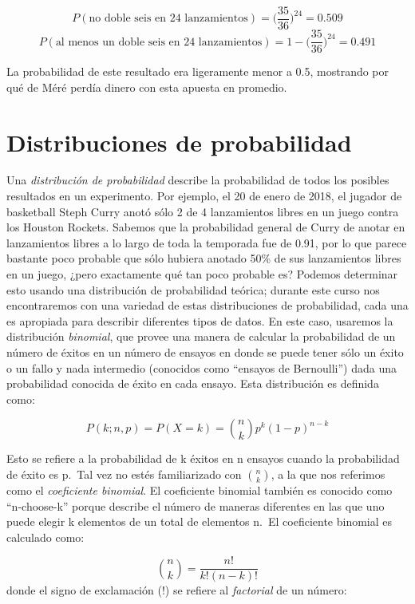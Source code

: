 \documentclass[
  12pt,
]{book}
\theoremstyle{definition}
\theoremstyle{definition}
\theoremstyle{definition}
\theoremstyle{remark}
\begin{document}
\[
P(\text{no doble seis en 24 lanzamientos}) = \bigg(\frac{35}{36}\bigg)^{24}=0.509
\]
\[
P(\text{al menos un doble seis en 24 lanzamientos}) = 1 - \bigg(\frac{35}{36}\bigg)^{24}=0.491
\]

La probabilidad de este resultado era ligeramente menor a 0.5, mostrando por qué de Méré perdía dinero con esta apuesta en promedio.

\hypertarget{distribuciones-de-probabilidad}{%
\section{Distribuciones de probabilidad}\label{distribuciones-de-probabilidad}}

Una \emph{distribución de probabilidad} describe la probabilidad de todos los posibles resultados en un experimento. Por ejemplo, el 20 de enero de 2018, el jugador de basketball Steph Curry anotó sólo 2 de 4 lanzamientos libres en un juego contra los Houston Rockets. Sabemos que la probabilidad general de Curry de anotar en lanzamientos libres a lo largo de toda la temporada fue de 0.91, por lo que parece bastante poco probable que sólo hubiera anotado 50\% de sus lanzamientos libres en un juego, ¿pero exactamente qué tan poco probable es? Podemos determinar esto usando una distribución de probabilidad teórica; durante este curso nos encontraremos con una variedad de estas distribuciones de probabilidad, cada una es apropiada para describir diferentes tipos de datos. En este caso, usaremos la distribución \emph{binomial}, que provee una manera de calcular la probabilidad de un número de éxitos en un número de ensayos en donde se puede tener sólo un éxito o un fallo y nada intermedio (conocidos como ``ensayos de Bernoulli'') dada una probabilidad conocida de éxito en cada ensayo. Esta distribución es definida como:

\[
P(k; n,p) = P(X=k) = \binom{n}{k} p^k(1-p)^{n-k}
\]

Esto se refiere a la probabilidad de k éxitos en n ensayos cuando la probabilidad de éxito es p.~Tal vez no estés familiarizado con \(\binom{n}{k}\), a la que nos referimos como el \emph{coeficiente binomial}. El coeficiente binomial también es conocido como ``n-choose-k'' porque describe el número de maneras diferentes en las que uno puede elegir k elementos de un total de elementos n.~El coeficiente binomial es calculado como:

\[
\binom{n}{k} = \frac{n!}{k!(n-k)!}
\]
donde el signo de exclamación (!) se refiere al \emph{factorial} de un número:
\end{document}
